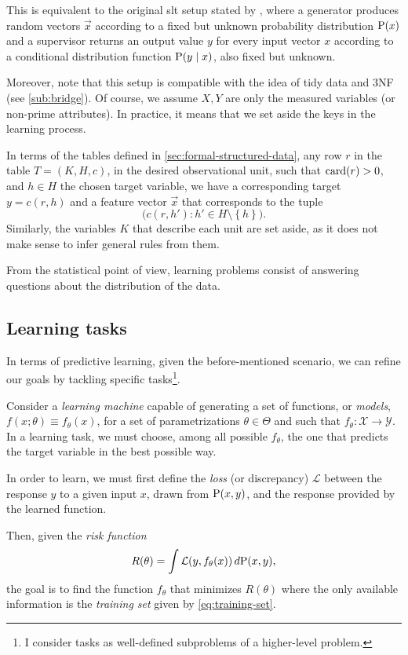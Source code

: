 This is equivalent to the original \gls{slt} setup stated by \textcite{Vapnik1999b}, where
a generator produces random vectors $\vec{x}$ according to a fixed but unknown
probability distribution $\Prob(x)$ and a supervisor returns an output value $y$ for every
input vector $x$ according to a conditional distribution function $\Prob(y \mid x)$, also fixed but
unknown.

Moreover, note that this setup is compatible with the idea of tidy data and 3NF (see
\cref{sub:bridge}). Of course, we assume $X, Y$ are only the measured variables (or
non-prime attributes).  In practice, it means that we set aside the keys in the learning
process.

In terms of the tables defined in \cref{sec:formal-structured-data}, any row $r$ in the
table $T = (K, H, c)$, in the desired observational unit, such that $\rowcard[r] > 0$, and
$h \in H$ the chosen target variable, we have a corresponding target $y = c(r, h)$ and a
feature vector $\vec{x}$ that corresponds to the tuple $$\big(c(r, h') : h' \in H \setminus
\left\{ h \right\}\big)\text{.}$$  Similarly, the variables $K$ that describe each unit
are set aside, as it does not make sense to infer general rules from them.

From the statistical point of view, learning problems consist of answering questions about
the distribution of the data.

\subsection{Learning tasks}

In terms of predictive learning, given the before-mentioned scenario, we can refine our
goals by tackling specific tasks\footnote{I consider tasks as well-defined subproblems of
a higher-level problem.}.

Consider a \emph{learning machine} capable of generating a set of functions, or
\emph{models}, $f(x; \theta) \equiv f_\theta(x)$, for a set of parametrizations $\theta
\in \Theta$ and such that $f_\theta : \mathcal{X} \rightarrow \mathcal{Y}$.  In a learning
task, we must choose, among all possible $f_\theta$, the one that predicts the target
variable in the best possible way.

In order to learn, we must first define the \emph{loss} (or discrepancy) $\mathcal{L}$
between the response $y$ to a given input $x$, drawn from $\Prob(x, y)$, and the
response provided by the learned function.

Then, given the \emph{risk function}
\begin{equation}
  \label{eq:risk}
  R(\theta) = \int \mathcal{L}(y, f_\theta(x))\, d\!\Prob(x, y)\text{,}
\end{equation}
the goal is to find the function $f_\theta$ that minimizes $R(\theta)$
where the only available information is the \emph{training set} given by \eqref{eq:training-set}.

